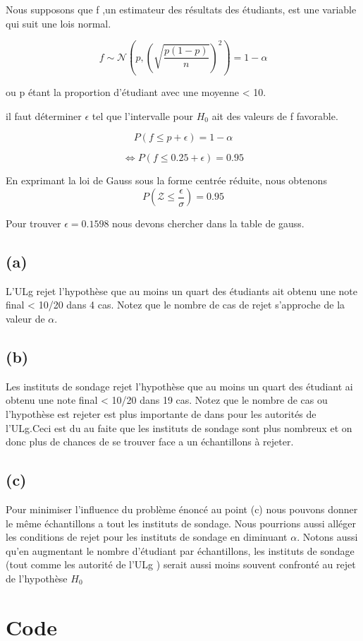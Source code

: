 \documentclass[10pt,a4paper]{article}
\begin{document}
Nous supposons que f ,un estimateur des résultats des étudiants, est une variable qui suit une lois normal.

\[ f \sim \mathcal{N}\left(p,\left(\sqrt{\frac{p(1-p)}{n}}\right)^2\right) = 1 - \alpha\]

ou p étant la proportion d'étudiant avec une moyenne < 10.

il faut déterminer $\epsilon$ tel que  l'intervalle pour $H_0$  ait des valeurs de f favorable.

\[ P\left(f \leq p + \epsilon\right) = 1 - \alpha \]

\[ \Leftrightarrow P\left(f \leq 0.25 + \epsilon\right) = 0.95 \]

En exprimant la loi de Gauss sous la forme centrée réduite, nous obtenons
\[P\left( \mathcal{Z} \leq \frac{\epsilon}{\sigma}\right) = 0.95\]

 Pour trouver $\epsilon = 0.1598$ nous devons chercher dans la table de gauss.
 
\subsection*{(a)}

L'ULg rejet l'hypothèse que au moins un quart des étudiants ait obtenu une note final < 10/20 dans 4 cas. Notez que le nombre de cas de rejet s'approche de la valeur de $\alpha$.

\subsection*{(b)}

Les instituts de sondage rejet l'hypothèse que au moins un quart des étudiant ai obtenu une note final < 10/20 dans 19 cas. Notez que le nombre de cas ou l'hypothèse est rejeter est plus importante de dans pour les autorités de l'ULg.Ceci est du au faite que les instituts de sondage sont plus nombreux et on donc plus de chances de se trouver face a un échantillons à rejeter. 

\subsection*{(c)}

Pour minimiser l'influence du problème énoncé au point (c) nous pouvons donner le même échantillons a tout les instituts de sondage. Nous pourrions aussi alléger les conditions de rejet pour les instituts de sondage  en diminuant $\alpha$. Notons aussi qu'en augmentant le nombre d'étudiant par échantillons, les instituts de sondage (tout comme les autorité de l'ULg ) serait aussi moins souvent confronté au rejet de l'hypothèse $H_0$  

\newpage

\section*{Code}

 
\newpage

\newpage

\ \\ \\

\newpage

\newpage
\end{document}
